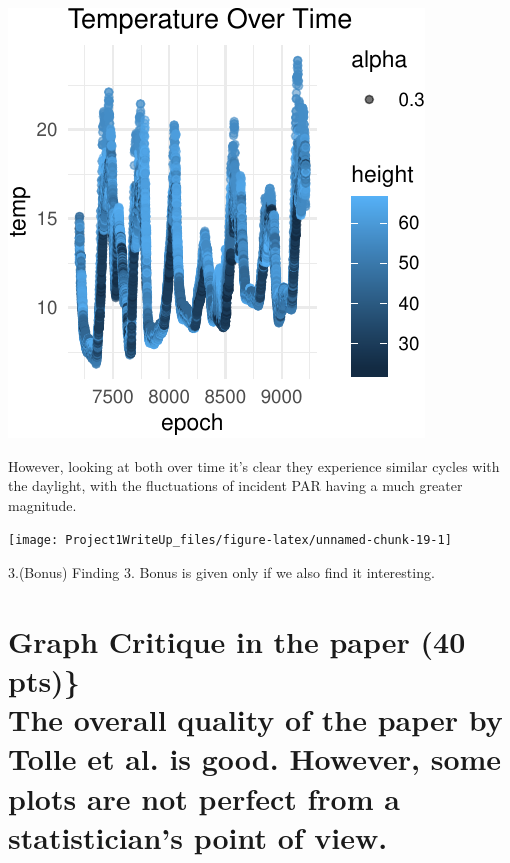 \documentclass[]{article}
\begin{document}
\begin{center}\includegraphics{Project1WriteUp_files/figure-latex/unnamed-chunk-18-1} \end{center}

However, looking at both over time it's clear they experience similar
cycles with the daylight, with the fluctuations of incident PAR having a
much greater magnitude.

\begin{center}\texttt{[image: Project1WriteUp\_files/figure-latex/unnamed-chunk-19-1]} \end{center}

3.(Bonus) Finding 3. Bonus is given only if we also find it interesting.

\section{\texorpdfstring{Graph Critique in the paper (40 pts)\}\\
The overall quality of the paper by Tolle et al. is good. However, some
plots are not perfect from a statistician's point of
view.}{Graph Critique in the paper (40 pts)\} The overall quality of the paper by Tolle et al. is good. However, some plots are not perfect from a statistician's point of view.}}\label{graph-critique-in-the-paper-40-pts-the-overall-quality-of-the-paper-by-tolle-et-al.-is-good.-however-some-plots-are-not-perfect-from-a-statisticians-point-of-view.}
\end{document}
